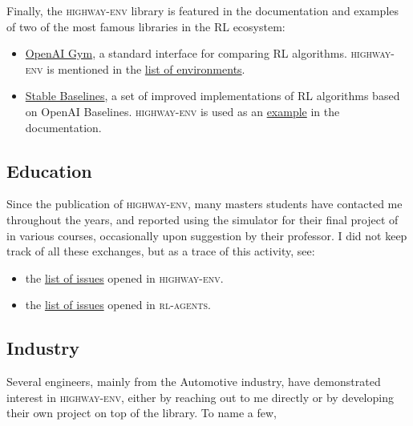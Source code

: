 \leavevmode\newline
\noindent Finally, the \textsc{highway-env} library is featured in the documentation and examples of two of the most famous libraries in the \gls{RL} ecosystem:
\begin{itemize}
\item \href{https://github.com/openai/gym}{OpenAI Gym}, a standard interface for comparing \gls{RL} algorithms. \textsc{highway-env} is mentioned in the \href{https://github.com/openai/gym/blob/master/docs/environments.md#highway-env-tactical-decision-making-for-autonomous-driving}{list of environments}.
\item \href{https://github.com/hill-a/stable-baselines}{Stable Baselines}, a set of improved implementations of \gls{RL} algorithms based on OpenAI Baselines. \textsc{highway-env} is used as an  \href{https://stable-baselines.readthedocs.io/en/master/guide/examples.html#hindsight-experience-replay-her}{example} in the documentation.
\end{itemize}

\subsection{Education}

Since the publication of \textsc{highway-env}, many masters students have contacted me throughout the years, and reported using the simulator for their final project of in various courses, occasionally upon suggestion by their professor.
I did not keep track of all these exchanges, but as a trace of this activity, see:
\begin{itemize}
	\item the \href{https://github.com/eleurent/highway-env/issues?q=is\%3Aissue}{list of issues} opened in \textsc{highway-env}.
	\item the \href{https://github.com/eleurent/rl-agents/issues?q=is\%3Aissue}{list of issues} opened in \textsc{rl-agents}.
\end{itemize} 

\subsection{Industry}

Several engineers, mainly from the Automotive industry, have demonstrated interest in \textsc{highway-env}, either by reaching out to me directly or by developing their own project on top of the library. To name a few,

